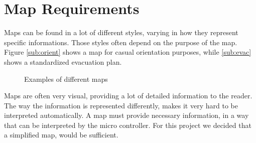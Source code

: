\newpage
\section{Map Requirements}
\label{ch:map_requirements}
Maps can be found in a lot of different styles,
varying in how they represent specific informations.
Those styles often depend on the purpose of the map.
Figure \ref{sub:orient} shows a map for casual orientation purposes,
while \ref{sub:evac} shows a standardized evacuation plan.

\begin{figure}[h!tp]
    \centering
    \hspace{0.1\textwidth}
    \caption{Examples of different maps}
    \label{fig:floor_plans}
\end{figure}

Maps are often very visual, providing a lot of detailed information to the reader.
The way the information is represented differently,
makes it very hard to be interpreted automatically.
A map must provide necessary information,
in a way that can be interpreted by the micro controller.
For this project we decided that a simplified map, would be sufficient.

